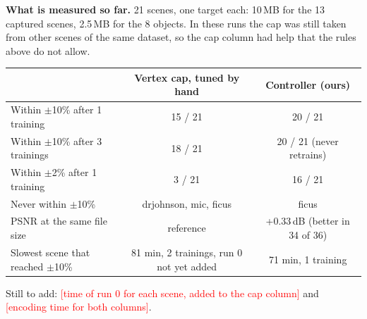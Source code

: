 \documentclass[10pt]{article}
\newcommand{\todo}[1]{\textcolor{red}{[#1]}}
\begin{document}
\textbf{What is measured so far.} 21 scenes, one target each: 10\,MB for the 13 captured scenes, 2.5\,MB for the 8 objects. In these runs the cap was still taken from other scenes of the same dataset, so the cap column had help that the rules above do not allow.

\begin{table}[H]\centering\small
\begin{tabular}{@{}lcc@{}}
\toprule
 & Vertex cap, tuned by hand & Controller (ours) \\
\midrule
Within $\pm$10\% after 1 training & 15 / 21 & 20 / 21 \\
Within $\pm$10\% after 3 trainings & 18 / 21 & 20 / 21 (never retrains) \\
Within $\pm$2\% after 1 training & 3 / 21 & 16 / 21 \\
Never within $\pm$10\% & drjohnson, mic, ficus & ficus \\
PSNR at the same file size & reference & +0.33\,dB (better in 34 of 36) \\
Slowest scene that reached $\pm$10\% & 81 min, 2 trainings, run 0 not yet added & 71 min, 1 training \\
\bottomrule
\end{tabular}
\end{table}
\vspace{-4pt}
Still to add: \todo{time of run 0 for each scene, added to the cap column} and \todo{encoding time for both columns}.
\end{document}
